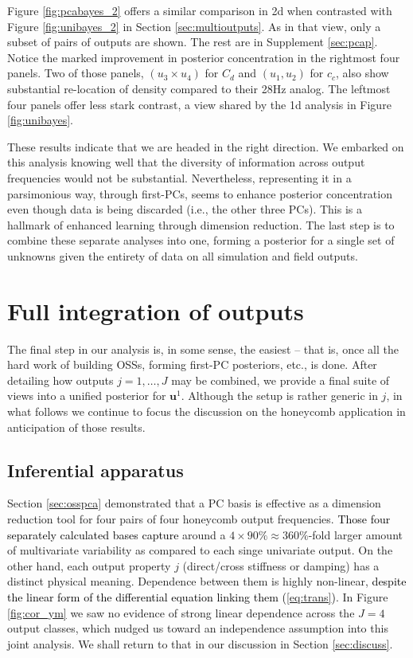 \documentclass[12pt]{article}
\newcommand{\blunew}[1]{\textcolor{black}{#1}} %
\begin{document}
Figure \ref{fig:pcabayes_2} offers a similar comparison in 2d when contrasted
with Figure \ref{fig:unibayes_2} in Section \ref{sec:multioutputs}.  As in
that view, only a subset of pairs of outputs are shown.  The rest are in
Supplement \ref{sec:pcap}.  Notice the marked improvement in posterior
concentration in the rightmost four panels.  Two of those panels, $(u_3 \times
u_4)$ for $C_d$ and $(u_1, u_2)$ for $c_c$, also show substantial re-location
of density compared to their 28Hz analog.  The leftmost four panels offer less
stark contrast, a view shared by the 1d analysis in Figure \ref{fig:unibayes}.

These results indicate that we are headed in the right direction.  We embarked
on this analysis knowing well that the diversity of information across
output frequencies would not be substantial.  Nevertheless, representing it in a
parsimonious way, through first-PCs, seems to enhance posterior concentration
even though data is being discarded (i.e., the other three PCs). This is a
hallmark of enhanced learning through dimension reduction.  The last step is
to combine these separate analyses into one, forming a posterior for a single
set of unknowns given the entirety of data on all simulation and field
outputs.


\section{Full integration of outputs}
\label{sec:allcali}

The final step in our analysis is, in some sense, the easiest -- that is, once
all the hard work of building OSSs, forming first-PC posteriors, etc., is
done.  After detailing how outputs $j=1,\dots,J$ may be combined, we provide a
final suite of views into a unified posterior for $\mathbf{u}^1$.  Although
the setup is rather generic in $j$, in what follows we continue to focus the
discussion on the honeycomb application in anticipation of those results.

\subsection{Inferential apparatus}

Section \ref{sec:osspca} demonstrated that a PC basis is effective as a
dimension reduction tool for four pairs of four honeycomb output frequencies.
\blunew{Those four separately calculated bases capture}
around a $4 \times 90\% \approx 360\%$-fold larger amount of multivariate
variability as compared to each singe univariate output.  On the other hand,
each output property $j$ (direct/cross stiffness or damping) has a
distinct physical meaning.  Dependence between them is highly
non-linear, \blunew{despite the linear form of the
differential equation linking them (\ref{eq:trans})}. In Figure
\ref{fig:cor_ym}  we saw no evidence of strong linear dependence across the
$J=4$ output classes, which nudged us toward an independence
assumption into this joint analysis.  We shall return to that in our
discussion in Section \ref{sec:discuss}. 
\end{document}
